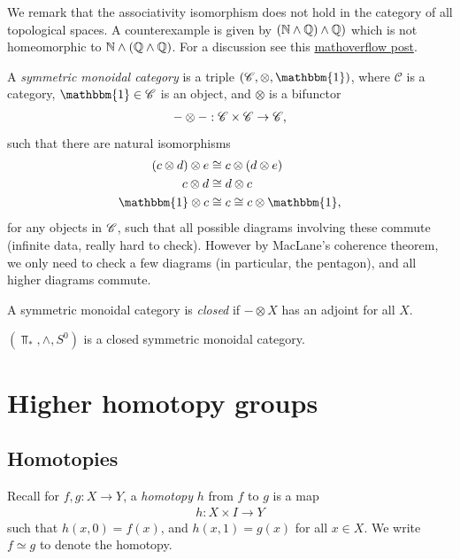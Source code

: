 \documentclass{article}[11pt]
\newcommand{\smashprod}{\wedge} %
\begin{document}
We remark that the associativity isomorphism does not hold in the category of all topological spaces. A counterexample is given by $(\N\smashprod \Q)\smashprod \Q)$ which is not homeomorphic to $\N\smashprod (\Q \smashprod \Q)$. For a discussion see this \href{https://mathoverflow.net/questions/196084/counterexample-for-associativity-of-smash-product}{mathoverflow post}.




\begin{definition} A \textit{symmetric monoidal category} is a triple $(\C,\otimes,\mathbbm{1})$, where $\mathscr{C}$ is a category, $\mathbbm{1}\in \mathscr{C}$ is an object, and $\otimes$ is a bifunctor
\begin{align*}
	- \otimes - : \mathscr{C} \times \mathscr{C} \to \mathscr{C},
\end{align*}
such that there are natural isomorphisms
\begin{align*}
	(c\otimes d)\otimes e &\cong c\otimes (d\otimes e) \\
	c\otimes d & \cong d\otimes c \\
	\mathbbm{1} \otimes c &\cong c \cong c\otimes \mathbbm{1},
\end{align*}
for any objects in $\mathscr{C}$, such that all possible diagrams involving these commute (infinite data, really hard to check). However by MacLane's coherence theorem, we only need to check a few diagrams (in particular, the pentagon), and all higher diagrams commute.
\end{definition}

\begin{definition} A symmetric monoidal category is \textit{closed} if $-\otimes X$ has an adjoint for all $X$.
\end{definition}

\begin{proposition} $(\Top_\ast, \smashprod, S^0)$ is a closed symmetric monoidal category.
\end{proposition}










\section{Higher homotopy groups}
\subsection{Homotopies}
Recall for $f,g : X \to Y$, a \textit{homotopy} $h$ from $f$ to $g$ is a map
\begin{align*}
	h : X\times I \to Y
\end{align*}
such that $h(x,0) = f(x)$, and $h(x,1) = g(x)$ for all $x\in X$. We write $f\simeq g$ to denote the homotopy.
\end{document}
